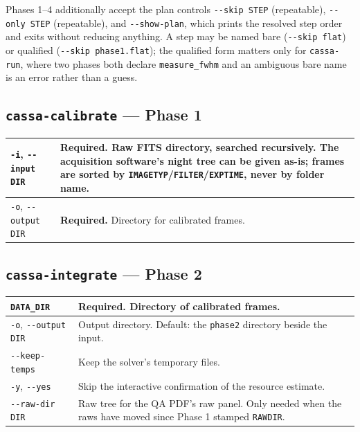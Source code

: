 \documentclass[11pt,a4paper]{article}
\begin{document}
Phases 1--4 additionally accept the plan controls \texttt{-{}-skip STEP}
(repeatable), \texttt{-{}-only STEP} (repeatable), and \texttt{-{}-show-plan},
which prints the resolved step order and exits without reducing anything. A step
may be named bare (\texttt{-{}-skip flat}) or qualified
(\texttt{-{}-skip phase1.flat}); the qualified form matters only for
\texttt{cassa-run}, where two phases both declare \texttt{measure\_fwhm} and an
ambiguous bare name is an error rather than a guess.

\subsection{\texttt{cassa-calibrate} --- Phase 1}
\begin{center}
\begin{tabularx}{\textwidth}{|l|X|}
\hline
\texttt{-i}, \texttt{-{}-input DIR} & \textbf{Required.} Raw FITS directory, searched recursively. The acquisition software's night tree can be given as-is; frames are sorted by \texttt{IMAGETYP}/\texttt{FILTER}/\texttt{EXPTIME}, never by folder name. \\
\hline
\texttt{-o}, \texttt{-{}-output DIR} & \textbf{Required.} Directory for calibrated frames. \\
\hline
\end{tabularx}
\end{center}

\subsection{\texttt{cassa-integrate} --- Phase 2}
\begin{center}
\begin{tabularx}{\textwidth}{|l|X|}
\hline
\texttt{DATA\_DIR} & \textbf{Required.} Directory of calibrated frames. \\
\hline
\texttt{-o}, \texttt{-{}-output DIR} & Output directory. Default: the \texttt{phase2} directory beside the input. \\
\hline
\texttt{-{}-keep-temps} & Keep the solver's temporary files. \\
\hline
\texttt{-y}, \texttt{-{}-yes} & Skip the interactive confirmation of the resource estimate. \\
\hline
\texttt{-{}-raw-dir DIR} & Raw tree for the QA PDF's raw panel. Only needed when the raws have moved since Phase 1 stamped \texttt{RAWDIR}. \\
\hline
\end{tabularx}
\end{center}
\end{document}
